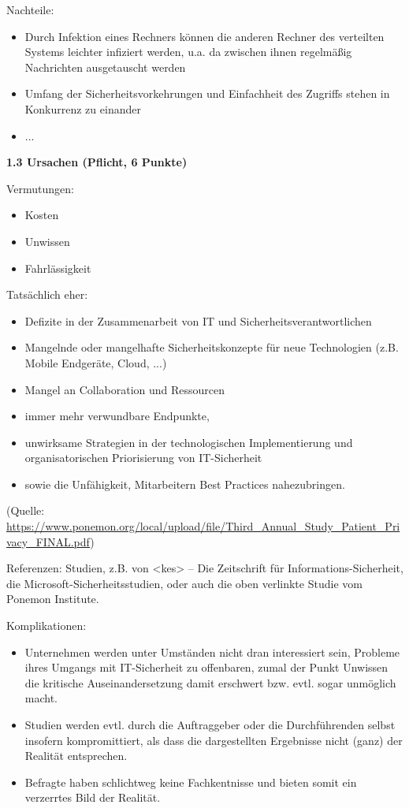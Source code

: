 \documentclass[ngerman]{fbi-aufgabenblatt}
\begin{document}
Nachteile: 
\begin{itemize}
\item Durch Infektion eines Rechners können die anderen Rechner des verteilten Systems leichter infiziert werden, u.a. da zwischen ihnen regelmäßig Nachrichten ausgetauscht werden
\item Umfang der Sicherheitsvorkehrungen und Einfachheit des Zugriffs stehen in Konkurrenz zu einander
\item ...
\end{itemize}

\textbf{1.3 Ursachen (Pflicht, 6 Punkte)}

Vermutungen:

\begin{itemize} 
\item Kosten
\item Unwissen
\item Fahrlässigkeit
\end{itemize}

Tatsächlich eher: 

\begin{itemize} 
\item Defizite in der Zusammenarbeit von IT und Sicherheitsverantwortlichen
\item Mangelnde oder mangelhafte Sicherheitskonzepte für neue Technologien (z.B. Mobile Endgeräte, Cloud, ...)
\item Mangel an Collaboration und Ressourcen
\end{itemize}

\begin{itemize} 
\item immer mehr verwundbare Endpunkte, 
\item unwirksame Strategien in der technologischen Implementierung und organisatorischen Priorisierung von IT-Sicherheit 
\item sowie die Unfähigkeit, Mitarbeitern Best Practices nahezubringen.
\end{itemize}

(Quelle: \url{https://www.ponemon.org/local/upload/file/Third_Annual_Study_Patient_Privacy_FINAL.pdf})

Referenzen: 
Studien, z.B. von <kes> – Die Zeitschrift für Informations-Sicherheit, die Microsoft-Sicherheitsstudien, 
oder auch die oben verlinkte Studie vom Ponemon Institute.

Komplikationen: 
\begin{itemize}
\item Unternehmen werden unter Umständen nicht dran interessiert sein,
Probleme ihres Umgangs mit IT-Sicherheit zu offenbaren, zumal der Punkt \dq Unwissen \dq
die kritische Auseinandersetzung damit erschwert bzw. evtl. sogar unmöglich macht.
\item Studien werden evtl. durch die Auftraggeber oder die Durchführenden selbst insofern kompromittiert, 
als dass die dargestellten Ergebnisse nicht (ganz) der Realität entsprechen.
\item Befragte haben schlichtweg keine Fachkentnisse und bieten somit ein verzerrtes Bild der Realität.
\end{itemize}
\end{document}

